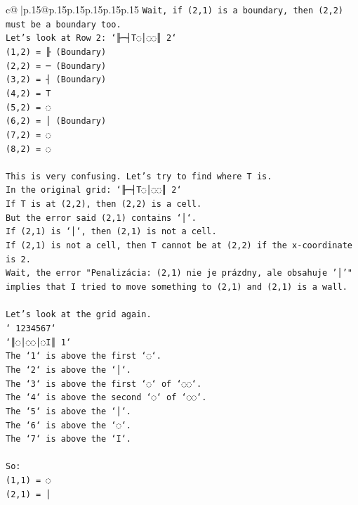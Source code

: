 \documentclass{article}
\begin{document}
{\begin{supertabular}{c@{$\;$}|p{.15\linewidth}@{}p{.15\linewidth}p{.15\linewidth}p{.15\linewidth}p{.15\linewidth}p{.15\linewidth}}
{{{\texttt{Wait, if (2,1) is a boundary, then (2,2) must be a boundary too.} \\
\texttt{Let's look at Row 2: `╟─┤T◌│◌◌║ 2`} \\
\texttt{(1,2) = ╟ (Boundary)} \\
\texttt{(2,2) = ─ (Boundary)} \\
\texttt{(3,2) = ┤ (Boundary)} \\
\texttt{(4,2) = T} \\
\texttt{(5,2) = ◌} \\
\texttt{(6,2) = │ (Boundary)} \\
\texttt{(7,2) = ◌} \\
\texttt{(8,2) = ◌} \\
\\ 
\texttt{This is very confusing. Let's try to find where T is.} \\
\texttt{In the original grid: `╟─┤T◌│◌◌║ 2`} \\
\texttt{If T is at (2,2), then (2,2) is a cell.} \\
\texttt{But the error said (2,1) contains `│`.} \\
\texttt{If (2,1) is `│`, then (2,1) is not a cell.} \\
\texttt{If (2,1) is not a cell, then T cannot be at (2,2) if the x{-}coordinate is 2.} \\
\texttt{Wait, the error "Penalizácia: (2,1) nie je prázdny, ale obsahuje '│'" implies that I tried to move something to (2,1) and (2,1) is a wall.} \\
\\ 
\texttt{Let's look at the grid again.} \\
\texttt{` 1234567`} \\
\texttt{`║◌│◌◌│◌I║ 1`} \\
\texttt{The `1` is above the first `◌`.} \\
\texttt{The `2` is above the `│`.} \\
\texttt{The `3` is above the first `◌` of `◌◌`.} \\
\texttt{The `4` is above the second `◌` of `◌◌`.} \\
\texttt{The `5` is above the `│`.} \\
\texttt{The `6` is above the `◌`.} \\
\texttt{The `7` is above the `I`.} \\
\\ 
\texttt{So:} \\
\texttt{(1,1) = ◌} \\
\texttt{(2,1) = │} \\
}}}
\end{supertabular}}
\end{document}
